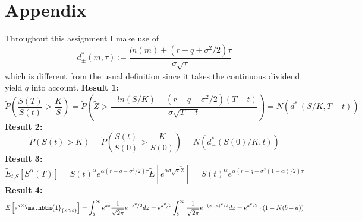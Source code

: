 \documentclass{article}[12pt,a4paper]
\begin{document}
  \section*{Appendix}
  Throughout this assignment I make use of
  $$d_{\pm}^{*}(m,\tau) := \frac{ln(m) + (r - q \pm \sigma^2/2)\tau}{\sigma\sqrt\tau}$$
  which is different from the usual definition since it takes the continuous dividend yield $q$ into account. \newline
  \newline\textbf{Result 1:}
  $$\widetilde{P}(\frac{S(T)}{S(t)} > \frac{K}{S}) = 
  \widetilde{P}(\widetilde{Z} > \frac{-ln(S/K) - (r - q - \sigma^2/2)(T - t)}{\sigma\sqrt{T - t}}) = N(d^*_-(S/K,T - t))$$ \newline
  \textbf{Result 2:}
  $$\widetilde{P}(S(t) > K) = \widetilde{P}(\frac{S(t)}{S(0)} > \frac{K}{S(0)}) = N(d_-^*(S(0)/K,t))$$ \newline
  \textbf{Result 3:}
  $$\widetilde{E}_{t\mbox{,}S}\left[ S^{\alpha}(T) \right] = 
   S(t)^\alpha e^{\alpha(r - q - \sigma^2/2)\tau} \widetilde{E}\left[ e^{\alpha \sigma \sqrt\tau \widetilde{Z}}\right] =
    S(t)^\alpha e^{\alpha(r - q - \sigma^2(1  - \alpha)/2 )\tau}$$ 
    \textbf{Result 4:}
    $$
    E \left[ e^{aZ} \mathbbm{1}_{\{ Z > b \}} \right] = 
    \int_b^{\infty} { e^{az} \frac{1}{\sqrt{2\pi}} e^{-z^2/2} dz} = 
    e^{a^2/2}\int_{b}^{\infty}{\frac{1}{\sqrt{2\pi}}  e^{-(z - a)^2/2} dz} = 
     e^{a^2/2} \cdot (1 - N(b - a))
    $$
  
\end{document}
